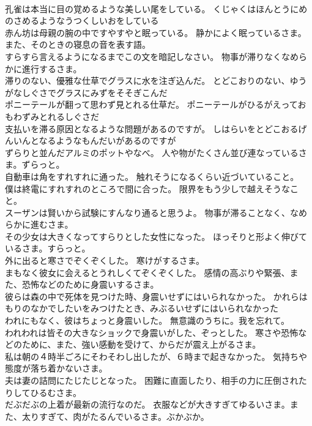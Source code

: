 \documentclass[8pt]{extreport}
\begin{document}
\begin{CJK}{UTF8}{min}
\\	孔雀は本当に目の覚めるような美しい尾をしている。	くじゃくはほんとうにめのさめるようなうつくしいおをしている 
\\	赤ん坊は母親の腕の中ですやすやと眠っている。	静かによく眠っているさま。また、そのときの寝息の音を表す語。
\\	すらすら言えるようになるまでこの文を暗記しなさい。	物事が滞りなくなめらかに進行するさま。
\\	滞りのない、優雅な仕草でグラスに水を注ぎ込んだ。	とどこおりのない、ゆうがなしぐさでグラスにみずをそそぎこんだ 
\\	ポニーテールが翻って思わず見とれる仕草だ。	ポニーテールがひるがえっておもわずみとれるしぐさだ 
\\	支払いを滞る原因となるような問題があるのですが。	しはらいをとどこおるげんいんとなるようなもんだいがあるのですが 
\\	ずらりと並んだアルミのポットやなべ。	人や物がたくさん並び連なっているさま。ずらっと。
\\	自動車は角をすれすれに通った。	触れそうになるくらい近づいていること。
\\	僕は終電にすれすれのところで間に合った。	限界をもう少しで越えそうなこと。
\\	スーザンは賢いから試験にすんなり通ると思うよ。	物事が滞ることなく、なめらかに進むさま。
\\	その少女は大きくなってすらりとした女性になった。	ほっそりと形よく伸びているさま。すらっと。
\\	外に出ると寒さでぞくぞくした。	寒けがするさま。
\\	まもなく彼女に会えるとうれしくてぞくぞくした。	感情の高ぶりや緊張、また、恐怖などのために身震いするさま。
\\	彼らは森の中で死体を見つけた時、身震いせずにはいられなかった。	かれらはもりのなかでしたいをみつけたとき、みぶるいせずにはいられなかった 
\\	われにもなく、彼はちょっと身震いした。	無意識のうちに。我を忘れて。
\\	われわれは皆その大きなショックで身震いがした、ぞっとした。	寒さや恐怖などのために、また、強い感動を受けて、からだが震え上がるさま。
\\	私は朝の４時半ごろにそわそわし出したが、６時まで起きなかった。	気持ちや態度が落ち着かないさま。
\\	夫は妻の詰問にたじたじとなった。	困難に直面したり、相手の力に圧倒されたりしてひるむさま。
\\	だぶだぶの上着が最新の流行なのだ。	衣服などが大きすぎてゆるいさま。また、太りすぎて、肉がたるんでいるさま。ぶかぶか。

\end{CJK}
\end{document}
